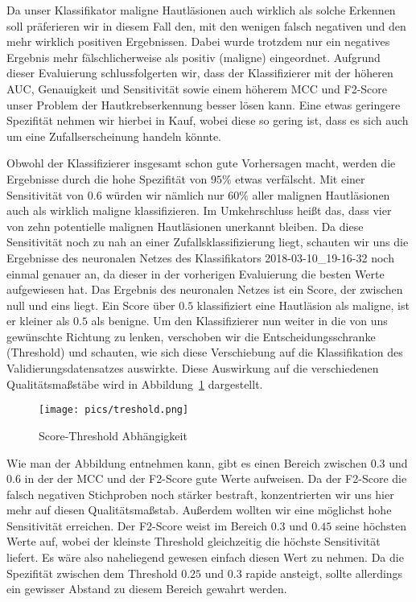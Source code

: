 Da unser Klassifikator maligne Hautläsionen auch wirklich als solche Erkennen soll präferieren wir in diesem Fall den, mit den wenigen falsch negativen und den mehr wirklich positiven Ergebnissen. Dabei wurde trotzdem nur ein negatives Ergebnis mehr fälschlicherweise als positiv (maligne) eingeordnet. Aufgrund dieser Evaluierung schlussfolgerten wir, dass der Klassifizierer mit der höheren AUC, Genauigkeit und Sensitivität sowie einem  höherem MCC und F2-Score unser Problem der Hautkrebserkennung besser lösen kann. Eine etwas geringere Spezifität nehmen wir hierbei in Kauf, wobei diese so gering ist, dass es sich auch um eine Zufallserscheinung handeln könnte.
 
Obwohl der Klassifizierer insgesamt schon gute Vorhersagen macht, werden die Ergebnisse durch die hohe Spezifität von $95\%$ etwas verfälscht. Mit einer Sensitivität von $0.6$ würden wir nämlich nur $60\%$ aller malignen Hautläsionen auch als wirklich maligne klassifizieren. Im Umkehrschluss heißt das, dass vier von zehn potentielle malignen Hautläsionen unerkannt bleiben. Da diese Sensitivität noch zu nah an einer Zufallsklassifizierung liegt, schauten wir uns die Ergebnisse des neuronalen Netzes des Klassifikators 2018-03-10\_19-16-32 noch einmal genauer an, da dieser in der vorherigen Evaluierung die besten Werte aufgewiesen hat. Das Ergebnis des neuronalen Netzes ist ein Score, der zwischen null und eins liegt. Ein Score über $0.5$ klassifiziert eine Hautläsion als maligne, ist er kleiner als $0.5$ als benigne. Um den Klassifizierer nun weiter in die von uns gewünschte Richtung zu lenken, verschoben wir die Entscheidungsschranke (Threshold) und schauten, wie sich diese Verschiebung auf die Klassifikation des Validierungsdatensatzes auswirkte. Diese Auswirkung auf die verschiedenen Qualitätsmaßstäbe wird in Abbildung~\ref{fig:threshold} dargestellt. 

\begin{figure}[htb!]
	\begin{center}
		\texttt{[image: pics/treshold.png]}
		\caption{Score-Threshold Abhängigkeit}
		\label{fig:threshold}
    \end{center}
\end{figure}

Wie man der Abbildung entnehmen kann, gibt es einen Bereich zwischen $0.3$ und $0.6$ in der der MCC und der F2-Score gute Werte aufweisen. Da der F2-Score die falsch negativen Stichproben noch stärker bestraft, konzentrierten wir uns hier mehr auf diesen Qualitätsmaßstab. Außerdem wollten wir eine möglichst hohe Sensitivität erreichen. Der F2-Score weist im Bereich $0.3$ und $0.45$ seine höchsten Werte auf, wobei der kleinste Threshold gleichzeitig die höchste Sensitivität liefert. Es wäre also naheliegend gewesen einfach diesen Wert zu nehmen. Da die Spezifität zwischen dem Threshold $0.25$ und $0.3$ rapide ansteigt, sollte allerdings ein gewisser Abstand zu diesem Bereich gewahrt werden. 

